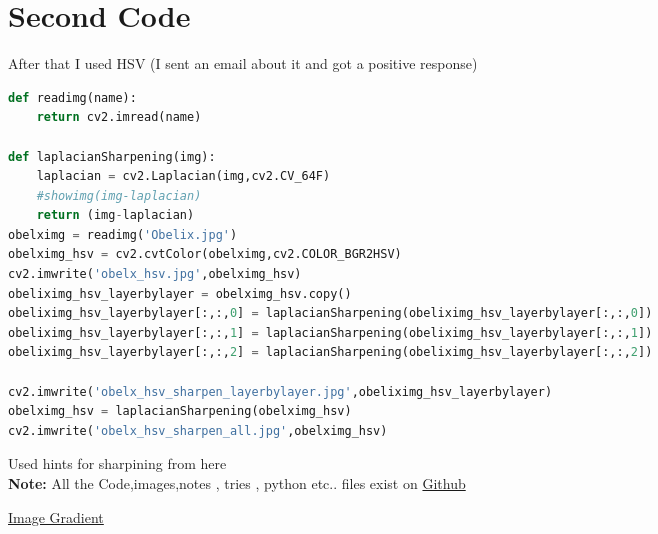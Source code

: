\documentclass{article}
\begin{document}
\section*{Second Code}
After that I used HSV (I sent an email about it and got a positive response)
\begin{lstlisting}[language=Python]
def readimg(name):
    return cv2.imread(name)

def laplacianSharpening(img):
    laplacian = cv2.Laplacian(img,cv2.CV_64F)
    #showimg(img-laplacian) 
    return (img-laplacian)
obelximg = readimg('Obelix.jpg')
obelximg_hsv = cv2.cvtColor(obelximg,cv2.COLOR_BGR2HSV)
cv2.imwrite('obelx_hsv.jpg',obelximg_hsv)
obeliximg_hsv_layerbylayer = obelximg_hsv.copy()
obeliximg_hsv_layerbylayer[:,:,0] = laplacianSharpening(obeliximg_hsv_layerbylayer[:,:,0])
obeliximg_hsv_layerbylayer[:,:,1] = laplacianSharpening(obeliximg_hsv_layerbylayer[:,:,1])
obeliximg_hsv_layerbylayer[:,:,2] = laplacianSharpening(obeliximg_hsv_layerbylayer[:,:,2])

cv2.imwrite('obelx_hsv_sharpen_layerbylayer.jpg',obeliximg_hsv_layerbylayer)
obelximg_hsv = laplacianSharpening(obelximg_hsv)
cv2.imwrite('obelx_hsv_sharpen_all.jpg',obelximg_hsv)
\end{lstlisting}
Used hints for sharpining from here\cite{1}\\
\textbf{Note:} All the Code,images,notes , tries , python etc.. files exist on \href{https://github.com/aqeel13932/IP/tree/master/hw5}{Github}
		\begin{thebibliography}{9}
		\href{https://github.com/abidrahmank/OpenCV2-Python-Tutorials/blob/master/source/py_tutorials/py_imgproc/py_gradients/py_gradients.rst}{Image Gradient}
		\end{thebibliography}
\end{document}
